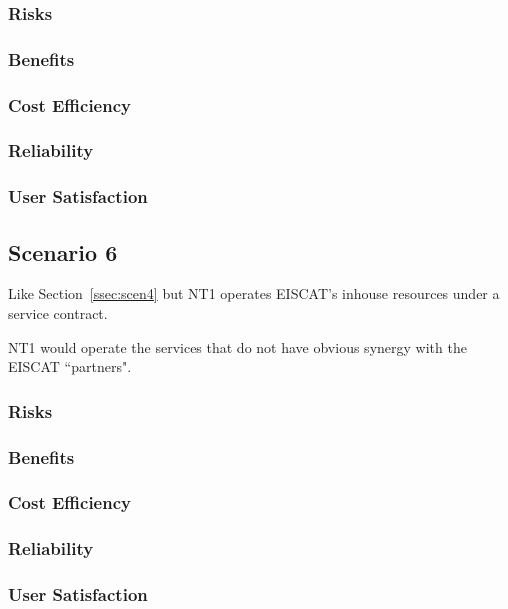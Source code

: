 \documentclass[12pt,a4paper]{article}
\begin{document}
\subsubsection*{Risks}
\bitm
\item 
\eitm

\subsubsection*{Benefits}
\bitm
\item 
\eitm

\subsubsection*{Cost Efficiency}
\bitm
\item 
\eitm

\subsubsection*{Reliability}
\bitm
\item 
\eitm

\subsubsection*{User Satisfaction}
\bitm
\item 
\eitm

\subsection{Scenario 6}
\label{ssec:scen6}

Like Section~\ref{ssec:scen4} but NT1 operates EISCAT's inhouse resources under a service contract.

NT1 would operate the services that do not have obvious synergy with the EISCAT ``partners".

\subsubsection*{Risks}
\bitm
\item 
\eitm

\subsubsection*{Benefits}
\bitm
\item 
\eitm

\subsubsection*{Cost Efficiency}
\bitm
\item 
\eitm

\subsubsection*{Reliability}
\bitm
\item 
\eitm

\subsubsection*{User Satisfaction}
\bitm
\item 
\eitm
\newpage
{}

\end{document}
